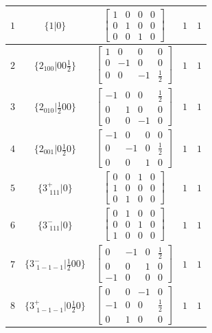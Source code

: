 \documentclass[fleqn,8pt]{jsarticle}
\begin{document}
\begin{longtable}{ccccc}
$ 1 $ & $ \{1|0\} $ & $ \begin{bmatrix} 1 & 0 & 0 & 0 \\ 0 & 1 & 0 & 0 \\ 0 & 0 & 1 & 0 \end{bmatrix} $ & $ 1 $ & $ 1 $ \\ \hline
$ 2 $ & $ \{2{}_{100}|0 0 \frac{1}{2}\} $ & $ \begin{bmatrix} 1 & 0 & 0 & 0 \\ 0 & -1 & 0 & 0 \\ 0 & 0 & -1 & \frac{1}{2} \end{bmatrix} $ & $ 1 $ & $ 1 $ \\ \hline
$ 3 $ & $ \{2{}_{010}|\frac{1}{2} 0 0\} $ & $ \begin{bmatrix} -1 & 0 & 0 & \frac{1}{2} \\ 0 & 1 & 0 & 0 \\ 0 & 0 & -1 & 0 \end{bmatrix} $ & $ 1 $ & $ 1 $ \\ \hline
$ 4 $ & $ \{2{}_{001}|0 \frac{1}{2} 0\} $ & $ \begin{bmatrix} -1 & 0 & 0 & 0 \\ 0 & -1 & 0 & \frac{1}{2} \\ 0 & 0 & 1 & 0 \end{bmatrix} $ & $ 1 $ & $ 1 $ \\ \hline
$ 5 $ & $ \{3^{+}_{\,\,111}|0\} $ & $ \begin{bmatrix} 0 & 0 & 1 & 0 \\ 1 & 0 & 0 & 0 \\ 0 & 1 & 0 & 0 \end{bmatrix} $ & $ 1 $ & $ 1 $ \\ \hline
$ 6 $ & $ \{3^{-}_{\,\,111}|0\} $ & $ \begin{bmatrix} 0 & 1 & 0 & 0 \\ 0 & 0 & 1 & 0 \\ 1 & 0 & 0 & 0 \end{bmatrix} $ & $ 1 $ & $ 1 $ \\ \hline
$ 7 $ & $ \{3^{-}_{\,\,1-1-1}|\frac{1}{2} 0 0\} $ & $ \begin{bmatrix} 0 & -1 & 0 & \frac{1}{2} \\ 0 & 0 & 1 & 0 \\ -1 & 0 & 0 & 0 \end{bmatrix} $ & $ 1 $ & $ 1 $ \\ \hline
$ 8 $ & $ \{3^{+}_{\,\,1-1-1}|0 \frac{1}{2} 0\} $ & $ \begin{bmatrix} 0 & 0 & -1 & 0 \\ -1 & 0 & 0 & \frac{1}{2} \\ 0 & 1 & 0 & 0 \end{bmatrix} $ & $ 1 $ & $ 1 $ \\ \hline

\end{longtable}
\end{document}
